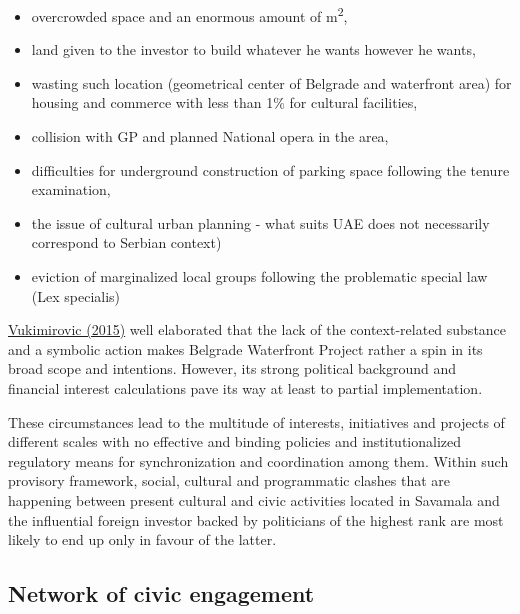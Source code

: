 \documentclass[11pt]{report}
\begin{document}
\begin{itemize}
\begin{itemize}
\item overcrowded space and an enormous amount of m\textsuperscript{2},
\item land given to the investor to build whatever he wants however he wants,
\item wasting such location (geometrical center of Belgrade and waterfront area) for housing and commerce with less than 1\% for cultural facilities,
\item collision with GP and planned National opera in the area,
\item difficulties for underground construction of parking space following the tenure examination,
\item the issue of cultural urban planning - what suits UAE does not necessarily correspond to Serbian context)
\item eviction of marginalized local groups following the problematic special law (Lex specialis)
\end{itemize}

\href{ref}{Vukimirovic (2015)} well elaborated that the lack of the context-related substance and a symbolic action makes Belgrade Waterfront Project rather a spin in its broad scope and intentions.
However, its strong political background and financial interest calculations pave its way at least to partial implementation.
\end{itemize}

These circumstances lead to the multitude of interests, initiatives and projects of different scales with no effective and binding policies and institutionalized regulatory means for synchronization and coordination among them.
Within such provisory framework, social, cultural and programmatic clashes that are happening between present cultural and civic activities located in Savamala and the influential foreign investor backed by politicians of the highest rank are most likely to end up only in favour of the latter.

\subsection{Network of civic engagement}
\end{document}

